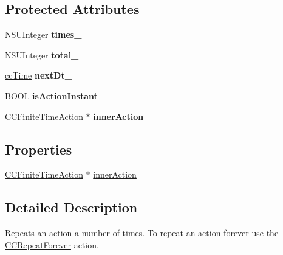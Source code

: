 \subsection*{Protected Attributes}
\begin{DoxyCompactItemize}
\item 
\hypertarget{interface_c_c_repeat_aca520d0605f7240697eb5ffdcc41ed63}{N\-S\-U\-Integer {\bfseries times\-\_\-}}\label{interface_c_c_repeat_aca520d0605f7240697eb5ffdcc41ed63}

\item 
\hypertarget{interface_c_c_repeat_ae46816e52820f8823635fddfa3a69a68}{N\-S\-U\-Integer {\bfseries total\-\_\-}}\label{interface_c_c_repeat_ae46816e52820f8823635fddfa3a69a68}

\item 
\hypertarget{interface_c_c_repeat_a5f7fcb34186536a718adf404f9678bcc}{\hyperlink{cc_types_8h_ae6c674aac4bfb46a4e6cb1e89bb66b4f}{cc\-Time} {\bfseries next\-Dt\-\_\-}}\label{interface_c_c_repeat_a5f7fcb34186536a718adf404f9678bcc}

\item 
\hypertarget{interface_c_c_repeat_adedd5f7b3802285719e26509ecdc7886}{B\-O\-O\-L {\bfseries is\-Action\-Instant\-\_\-}}\label{interface_c_c_repeat_adedd5f7b3802285719e26509ecdc7886}

\item 
\hypertarget{interface_c_c_repeat_aa93f97bd71b3c6e9d5c392e7430f8927}{\hyperlink{interface_c_c_finite_time_action}{C\-C\-Finite\-Time\-Action} $\ast$ {\bfseries inner\-Action\-\_\-}}\label{interface_c_c_repeat_aa93f97bd71b3c6e9d5c392e7430f8927}

\end{DoxyCompactItemize}
\subsection*{Properties}
\begin{DoxyCompactItemize}
\item 
\hyperlink{interface_c_c_finite_time_action}{C\-C\-Finite\-Time\-Action} $\ast$ \hyperlink{interface_c_c_repeat_af145ecadc2068c957ddc9f06e16379c2}{inner\-Action}
\end{DoxyCompactItemize}


\subsection{Detailed Description}
Repeats an action a number of times. To repeat an action forever use the \hyperlink{interface_c_c_repeat_forever}{C\-C\-Repeat\-Forever} action. 

